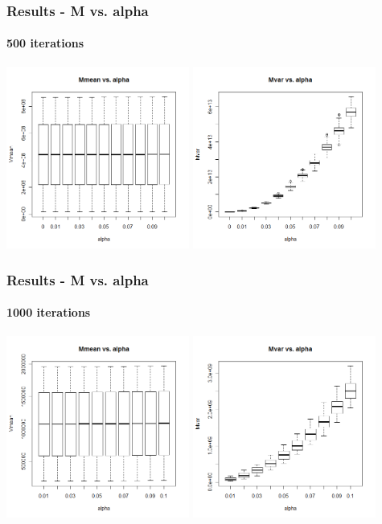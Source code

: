 \begin{frame}
    \frametitle{Results - M vs. alpha }
	\framesubtitle{500 iterations}
\hspace*{-5mm}
\includegraphics[height=6cm]{boxplot500_mmean_alpha}
\includegraphics[height=6cm]{boxplot500_mvar_alpha}
\end{frame}

\begin{frame}
    \frametitle{Results - M vs. alpha }
	\framesubtitle{1000 iterations}
\hspace*{-5mm}
\includegraphics[height=6cm]{boxplot1000_mmean_alpha}
\includegraphics[height=6cm]{boxplot1000_mvar_alpha}
\end{frame}



